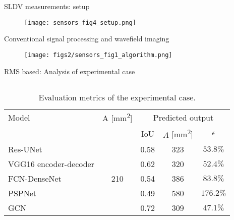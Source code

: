 \documentclass[10pt,aspectratio=169,dvipsnames]{beamer} %
\begin{document}
	\begin{frame}{SLDV measurements: setup}
		\begin{figure}
			\texttt{[image: sensors\_fig4\_setup.png]}
		\end{figure}
	\end{frame}
	\setcounter{subfigure}{0}
	\begin{frame}[t]{Conventional signal processing and wavefield imaging}
		\begin{figure}
			\texttt{[image: figs2/sensors\_fig1\_algorithm.png]}
		\end{figure}
	\end{frame}
	\setcounter{subfigure}{0}
	\begin{frame}{RMS based: Analysis of experimental case}
		\begin{columns}[T]
			\begin{column}[t]{0.9\textwidth}
				\centering
				\begin{table}[!ht]
					\centering
					\caption{Evaluation metrics of the experimental case.}
					\label{tab:rms_exp_case_}
					\begin{tabular}{l@{\ }cccc}
						\toprule
						\multicolumn{1}{l}{Model} & \multicolumn{1}{c}{A [mm\textsuperscript{2}]} & \multicolumn{3}{c}{Predicted output} \\ 
						\cmidrule(lr){3-5} & & \multicolumn{1}{c}{IoU} & \multicolumn{1}{c}{\(\hat{A}\) [mm\textsuperscript{2}]} & \(\epsilon\) \\ \midrule
						Res-UNet & \multicolumn{1}{c}{\multirow{5}{*}{210}} & \multicolumn{1}{c}{0.58} & \multicolumn{1}{c}{323}  & \(53.8\%\) \\ 
						VGG16 encoder-decoder &  & \multicolumn{1}{c}{0.62} & \multicolumn{1}{c}{320} & \(52.4\%\) 
						\\ 
						FCN-DenseNet &  & \multicolumn{1}{c}{0.54} & \multicolumn{1}{c}{386} & \(83.8\%\) \\ 
						PSPNet &  & \multicolumn{1}{c}{0.49} & \multicolumn{1}{c}{580} & \(176.2\%\) 
						\\ 
						GCN &  & \multicolumn{1}{c}{0.72} & \multicolumn{1}{c}{309} & \(47.1\%\) 
						\\ 
						\bottomrule
					\end{tabular}		
				\end{table}
			\end{column}
		\end{columns}			
	\end{frame}
\end{document}
